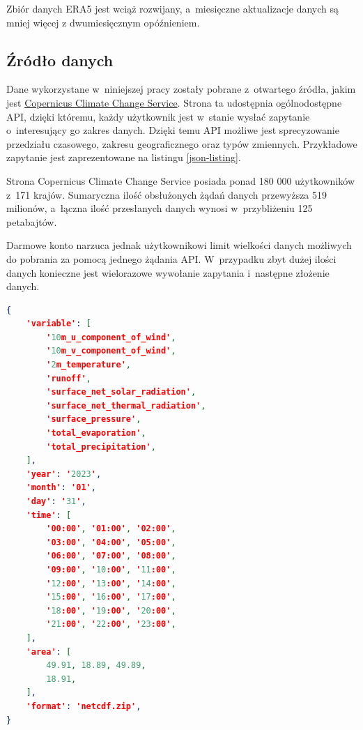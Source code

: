Zbiór danych ERA5 jest wciąż rozwijany, a~miesięczne aktualizacje danych są mniej więcej
z dwumiesięcznym opóźnieniem.

\subsection{Źródło danych}

Dane wykorzystane w~niniejszej pracy zostały pobrane z~otwartego źródła, jakim jest
\href{https://cds.climate.copernicus.eu/cdsapp#!/dataset/reanalysis-era5-land?tab=form}{Copernicus Climate Change Service}.
Strona ta udostępnia ogólnodostępne API, dzięki któremu, każdy użytkownik jest w~stanie
wysłać zapytanie o~interesujący go zakres danych. Dzięki temu API możliwe jest sprecyzowanie
przedziału czasowego, zakresu geograficznego oraz typów zmiennych. Przykładowe zapytanie jest 
zaprezentowane na listingu \ref{json-listing}.

Strona Copernicus Climate Change Service posiada ponad 180 000 użytkowników z~171 krajów. Sumaryczna
ilość obsłużonych żądań danych przewyższa 519 milionów, a~łączna ilość przesłanych danych wynosi
w~przybliżeniu 125 petabajtów.

Darmowe konto narzuca jednak użytkownikowi limit wielkości danych możliwych do pobrania 
za pomocą jednego żądania API. W~przypadku zbyt dużej ilości danych konieczne
jest wielorazowe wywołanie zapytania i~następne złożenie danych.

\begin{lstlisting}[label=json-listing,caption={Przykładowe zapytanie API CDS Climate Copernicus},language=json]
{
    'variable': [
        '10m_u_component_of_wind', 
        '10m_v_component_of_wind', 
        '2m_temperature',
        'runoff', 
        'surface_net_solar_radiation', 
        'surface_net_thermal_radiation',
        'surface_pressure', 
        'total_evaporation', 
        'total_precipitation',
    ],
    'year': '2023',
    'month': '01',
    'day': '31',
    'time': [
        '00:00', '01:00', '02:00',
        '03:00', '04:00', '05:00',
        '06:00', '07:00', '08:00',
        '09:00', '10:00', '11:00',
        '12:00', '13:00', '14:00',
        '15:00', '16:00', '17:00',
        '18:00', '19:00', '20:00',
        '21:00', '22:00', '23:00',
    ],
    'area': [
        49.91, 18.89, 49.89,
        18.91,
    ],
    'format': 'netcdf.zip',
}
\end{lstlisting}

